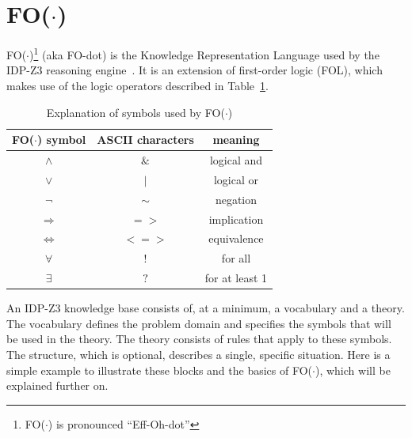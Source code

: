 \documentclass[11pt,a4paper]{report}
\newcommand{\fodot}{FO($\cdot$)\xspace}
\begin{document}
\section{\fodot}
\label{fodot}
\fodot \footnote{\fodot is pronounced ``Eff-Oh-dot''} (aka FO-dot) is the Knowledge Representation Language used by the IDP-Z3 reasoning engine~\cite{IDPZ3ReasoningEngine}. It is an extension of first-order logic (FOL), which makes use of the logic operators described in Table~\ref{tab:fodot_symbols}.

\begin{table}
    \centering
    \caption{Explanation of symbols used by \fodot}
    \label{tab:fodot_symbols}
    \begin{tabular}{|c|c|c|}
    \hline
    \fodot symbol & ASCII characters & meaning \\ \hline
    $\land$  & $\&$ & logical and   \\ \hline
    $\lor$   & $\mid$ & logical or   \\ \hline
    $\neg$   & $\sim$ & negation   \\ \hline
    $\Rightarrow$ & $=>$ & implication   \\ \hline
    $\Leftrightarrow$ & $<=>$ & equivalence   \\ \hline
    $\forall$ & $!$ & for all   \\ \hline
    $\exists$   & $?$ & for at least 1   \\ \hline
    \end{tabular}
\end{table}


An IDP-Z3 knowledge base consists of, at a minimum, a vocabulary and a theory. The vocabulary defines the problem domain and specifies the symbols that will be used in the theory. The theory consists of rules that apply to these symbols. The structure, which is optional, describes a single, specific situation. Here is a simple example to illustrate these blocks and the basics of \fodot, which will be explained further on.
\end{document}
